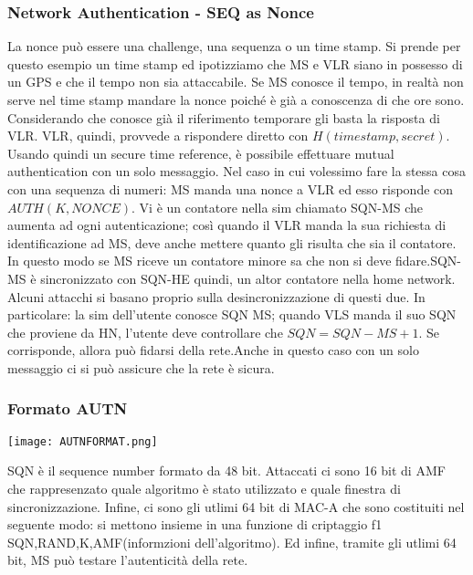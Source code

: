 \documentclass{article}
\theoremstyle{remark}
\begin{document}
\subsubsection{Network Authentication - SEQ as Nonce}
La nonce può essere una challenge, una sequenza o un time stamp. Si prende per questo esempio un time stamp ed ipotizziamo che MS e VLR siano in possesso di un GPS e che il tempo non sia attaccabile. Se MS conosce il tempo, in realtà non serve nel time stamp mandare la nonce poiché è già a conoscenza di che ore sono. Considerando che conosce già il riferimento temporare gli basta la risposta di VLR. VLR, quindi, provvede a rispondere diretto con $H(timestamp,secret)$. Usando quindi un secure time reference, è possibile effettuare mutual authentication con un solo messaggio.\newline
Nel caso in cui volessimo fare la stessa cosa con una sequenza di numeri:\newline
MS manda una nonce a VLR ed esso risponde con $AUTH(K,NONCE)$.  Vi è un contatore nella sim chiamato SQN-MS che aumenta ad ogni autenticazione; così quando il VLR manda la sua richiesta di identificazione ad MS, deve anche mettere quanto gli risulta che sia il contatore. In questo modo se MS riceve un contatore minore sa che non si deve fidare.SQN-MS è sincronizzato con SQN-HE quindi, un altor contatore nella home network. Alcuni attacchi si basano proprio sulla desincronizzazione di questi due. In particolare: la sim dell'utente conosce SQN MS; quando VLS manda il suo SQN che proviene da HN, l'utente deve controllare che $SQN=SQN-MS+1$. Se corrisponde, allora può fidarsi della rete.\newline Anche in questo caso con un solo messaggio ci si può assicure che la rete è sicura.
\subsubsection{Formato AUTN}
\begin{center}
    \texttt{[image: AUTNFORMAT.png]}
\end{center}
SQN è il sequence number formato da 48 bit. Attaccati ci sono 16 bit di AMF che rappresenzato quale algoritmo è stato utilizzato e quale finestra di sincronizzazione. Infine, ci sono gli utlimi 64 bit di MAC-A che sono costituiti nel seguente modo: si mettono insieme in una funzione di criptaggio f1 SQN,RAND,K,AMF(informzioni dell'algoritmo). Ed infine, tramite gli utlimi 64 bit, MS può testare l'autenticità della rete.
\end{document}
